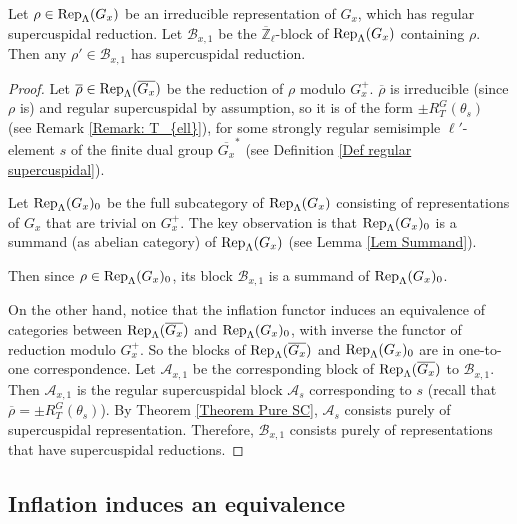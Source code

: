 		\begin{theorem} \label{Thm SC Red restate}
			Let $\rho \in \operatorname{\operatorname{Rep}}_{\Lambda}(G_x)$ be an irreducible representation of $G_x$, which has regular supercuspidal reduction. Let $\mathcal{B}_{x,1}$ be the $\overline{\mathbb{Z}}_{\ell}$-block of $\operatorname{\operatorname{Rep}}_{\Lambda}(G_x)$ containing $\rho$. Then any $\rho' \in \mathcal{B}_{x,1}$ has supercuspidal reduction.
		\end{theorem}
		
		\begin{proof}
			Let $\overline{\rho} \in \operatorname{\operatorname{Rep}}_{\Lambda}(\overline{G_x})$ be the reduction of $\rho$ modulo $G_x^+$. $\overline{\rho}$ is irreducible (since $\rho$ is) and regular supercuspidal by assumption, so it is of the form $\pm R_T^G(\theta_s)$ (see Remark \ref{Remark: T_{ell}}), for some strongly regular semisimple $\ell'$-element $s$ of the finite dual group $\overline{G_x}^*$ (see Definition \ref{Def regular supercuspidal}).  
			
			Let $\operatorname{\operatorname{Rep}}_{\Lambda}(G_x)_0$ be the full subcategory of $\operatorname{\operatorname{Rep}}_{\Lambda}(G_x)$ consisting of representations of $G_x$ that are trivial on $G_x^+$. The key observation is that $\operatorname{\operatorname{Rep}}_{\Lambda}(G_x)_0$ is a summand (as abelian category) of $\operatorname{\operatorname{Rep}}_{\Lambda}(G_x)$ (see Lemma \ref{Lem Summand}).
			
			Then since $\rho \in \operatorname{\operatorname{Rep}}_{\Lambda}(G_x)_0$, its block $\mathcal{B}_{x,1}$ is a summand of $\operatorname{\operatorname{Rep}}_{\Lambda}(G_x)_0$.
			
			On the other hand, notice that the inflation functor induces an equivalence of categories between $\operatorname{\operatorname{Rep}}_{\Lambda}(\overline{G_x})$ and $\operatorname{\operatorname{Rep}}_{\Lambda}(G_x)_0$, with inverse the functor of reduction modulo $G_x^+$.
			So the blocks of $\operatorname{\operatorname{Rep}}_{\Lambda}(\overline{G_x})$ and $\operatorname{\operatorname{Rep}}_{\Lambda}(G_x)_0$ are in one-to-one correspondence. Let $\mathcal{A}_{x,1}$ be the corresponding block of $\operatorname{\operatorname{Rep}}_{\Lambda}(\overline{G_x})$ to $\mathcal{B}_{x,1}$. Then $\mathcal{A}_{x,1}$ is the regular supercuspidal block $\mathcal{A}_s$ corresponding to $s$ (recall that $\overline{\rho}=\pm R_T^G(\theta_s)$). By Theorem \ref{Theorem Pure SC}, $\mathcal{A}_s$ consists purely of supercuspidal representation. Therefore, $\mathcal{B}_{x,1}$ consists purely of representations that have supercuspidal reductions. 
		\end{proof}
		
		
     \subsection{Inflation induces an equivalence}  \label{Subsection_inflation} 		
		
